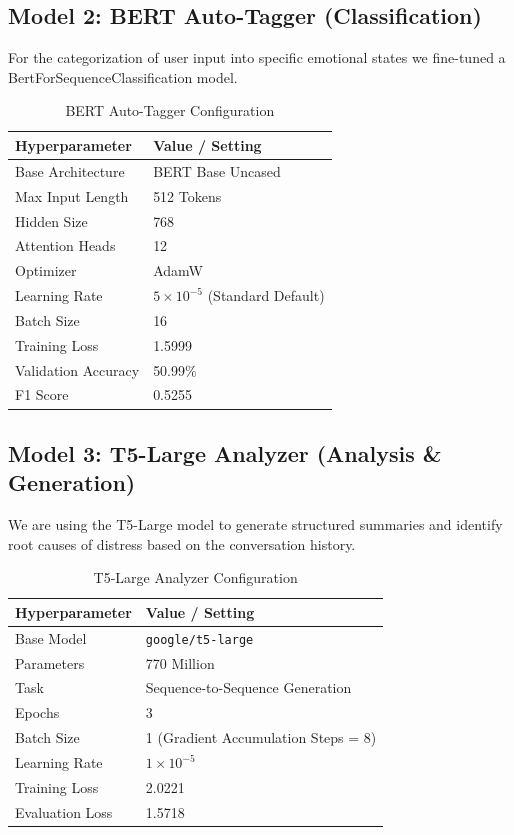 \subsection{Model 2: BERT Auto-Tagger (Classification)}
For the categorization of user input into specific emotional states we fine-tuned a BertForSequenceClassification model.

\begin{table}[H]
\centering
\renewcommand{\arraystretch}{1.2}
\begin{tabular}{|l|l|}
\hline
\rowcolor{gray!15} \textbf{Hyperparameter} & \textbf{Value / Setting} \\ \hline
Base Architecture & BERT Base Uncased \\ \hline
Max Input Length & 512 Tokens \\ \hline
Hidden Size & 768 \\ \hline
Attention Heads & 12 \\ \hline
Optimizer & AdamW \\ \hline
Learning Rate & $5 \times 10^{-5}$ (Standard Default) \\ \hline
Batch Size & 16 \\ \hline
Training Loss & 1.5999 \\ \hline
Validation Accuracy & 50.99\% \\ \hline
F1 Score & 0.5255 \\ \hline
\end{tabular}
\caption{BERT Auto-Tagger Configuration}
\label{tab:bert_config}
\end{table}

\newpage
\subsection{Model 3: T5-Large Analyzer (Analysis \& Generation)}
We are using the T5-Large model to generate structured summaries and identify root causes of distress based on the conversation history.

\begin{table}[H]
\centering
\renewcommand{\arraystretch}{1.2}
\begin{tabular}{|l|l|}
\hline
\rowcolor{gray!15} \textbf{Hyperparameter} & \textbf{Value / Setting} \\ \hline
Base Model & \texttt{google/t5-large} \\ \hline
Parameters & 770 Million \\ \hline
Task & Sequence-to-Sequence Generation \\ \hline
Epochs & 3 \\ \hline
Batch Size & 1 (Gradient Accumulation Steps = 8) \\ \hline
Learning Rate & $1 \times 10^{-5}$ \\ \hline
Training Loss & 2.0221 \\ \hline
Evaluation Loss & 1.5718 \\ \hline
\end{tabular}
\caption{T5-Large Analyzer Configuration}
\label{tab:t5_config}
\end{table}


